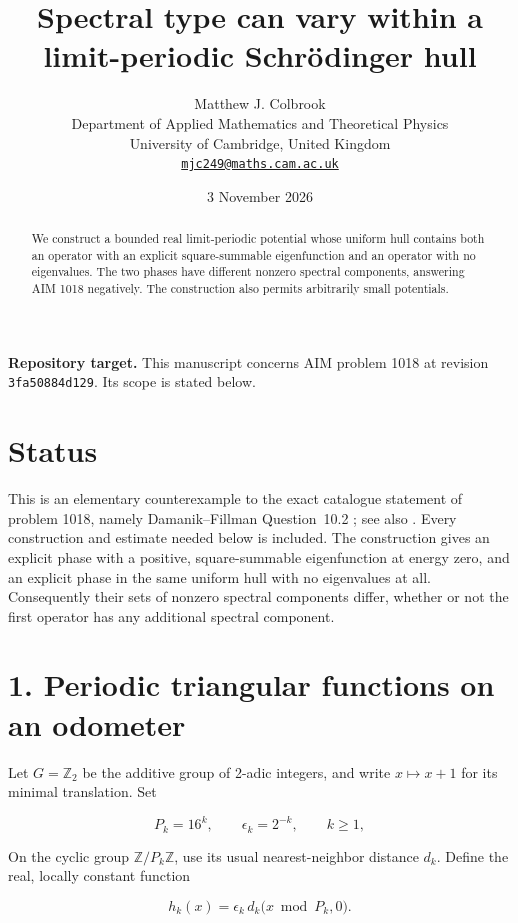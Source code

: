 \documentclass[11pt,a4paper]{article}
\title{\textbf{Spectral type can vary within a limit-periodic Schrödinger hull}}
\author{Matthew J. Colbrook\\[3pt]
{\small Department of Applied Mathematics and Theoretical Physics}\\
{\small University of Cambridge, United Kingdom}\\
{\small\href{mailto:mjc249@maths.cam.ac.uk}{\texttt{mjc249@maths.cam.ac.uk}}}}
\date{3 November 2026}
\begin{document}
\maketitle
\begin{abstract}
We construct a bounded real limit-periodic potential whose uniform hull contains both an operator with an explicit square-summable eigenfunction and an operator with no eigenvalues. The two phases have different nonzero spectral components, answering AIM 1018 negatively. The construction also permits arbitrarily small potentials.
\end{abstract}
\noindent\textbf{Repository target.}
This manuscript concerns AIM problem 1018 at revision
\texttt{3fa50884d129}. Its scope is stated below.
\medskip

\hypertarget{1018-status}{%
\section{Status}\label{1018-status}}

This is an elementary counterexample to the exact catalogue statement of
problem 1018, namely Damanik--Fillman Question~10.2
\cite[arXiv v1, p.~36]{DF20}; see also \cite[Remark~(v)]{DG11}.
Every construction and estimate needed below is included.
The construction gives an explicit phase with a positive,
square-summable eigenfunction at energy zero, and an explicit phase in
the same uniform hull with no eigenvalues at all. Consequently their
sets of nonzero spectral components differ, whether or not the first
operator has any additional spectral component.

\hypertarget{1018-periodic-triangular-functions-on-an-odometer}{%
\section{1. Periodic triangular functions on an
odometer}\label{1018-periodic-triangular-functions-on-an-odometer}}

Let \(G=\mathbb Z_2\) be the additive group of 2-adic integers, and
write \(x\mapsto x+1\) for its minimal translation. Set

\[
P_k=16^k,\qquad \epsilon_k=2^{-k},\qquad k\geq1,
\]

On the cyclic group \(\mathbb Z/P_k\mathbb Z\), use its usual
nearest-neighbor distance \(d_k\). Define the real, locally constant
function

\[
h_k(x)=\epsilon_k\,d_k\bigl(x\bmod P_k,0\bigr).
\tag{1}
\]
\end{document}
